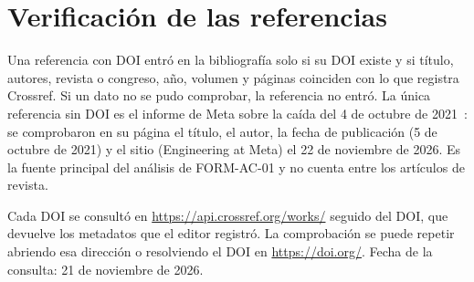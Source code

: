 \section{Verificación de las referencias}\label{sec:verificacion}

Una referencia con DOI entró en la bibliografía solo si su DOI existe y si título, autores, revista o congreso, año, volumen y páginas coinciden con lo que registra Crossref. Si un dato no se pudo comprobar, la referencia no entró. La única referencia sin DOI es el informe de Meta sobre la caída del 4 de octubre de 2021~\cite{janardhan2021outage}: se comprobaron en su página el título, el autor, la fecha de publicación (5 de octubre de 2021) y el sitio (Engineering at Meta) el 22 de noviembre de 2026. Es la fuente principal del análisis de FORM-AC-01 y no cuenta entre los artículos de revista.

Cada DOI se consultó en \url{https://api.crossref.org/works/} seguido del DOI, que devuelve los metadatos que el editor registró. La comprobación se puede repetir abriendo esa dirección o resolviendo el DOI en \url{https://doi.org/}. Fecha de la consulta: 21 de noviembre de 2026.

